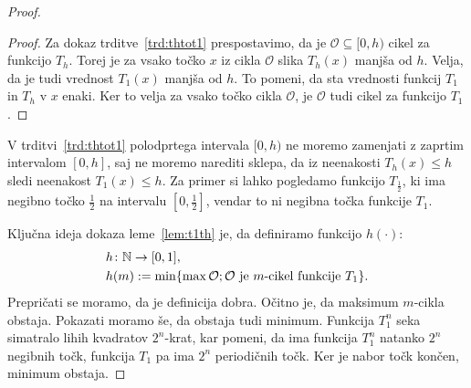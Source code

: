 \documentclass[../TG_magistrsko_delo_sections.tex]{subfiles}
\begin{document}
\begin{proof}
\begin{proof}
Za dokaz trditve~\ref{trd:thtot1} prespostavimo, da je $\mathcal{O} \subseteq [0, h)$ cikel za funkcijo $T_h$. Torej je za vsako točko $x$ iz cikla $\mathcal{O}$ slika $T_h(x)$ manjša od $h$. Velja, da je tudi vrednost $T_1(x)$ manjša od $h$. To pomeni, da sta vrednosti funkcij $T_1$ in $T_h$ v $x$ enaki. Ker to velja za vsako točko cikla $\mathcal{O}$, je $\mathcal{O}$ tudi cikel za funkcijo $T_1$.
\end{proof}
V trditvi~\ref{trd:thtot1} polodprtega intervala $[0, h)$ ne moremo zamenjati z zaprtim intervalom $[0, h]$, saj ne moremo narediti sklepa, da iz neenakosti $T_h(x) \leq h$ sledi neenakost $T_1(x) \leq h$. Za primer si lahko pogledamo funkcijo $T_{\frac{1}{2}}$, ki ima negibno točko $\frac{1}{2}$ na intervalu $[0, \frac{1}{2}]$, vendar to ni negibna točka funkcije $T_1$.

Ključna ideja dokaza leme~\ref{lem:t1th} je, da definiramo funkcijo $h(\cdot)$:
\begin{equation*}
\begin{split}
&h\colon \mathbb N \to [0, 1],\\
&h(m):=  \min\{\max \mathcal{O}; \mathcal{O}\text{ je }m\text{-cikel funkcije }T_1 \}.
\end{split}
\end{equation*}
Prepričati se moramo, da je definicija dobra. Očitno je, da maksimum $m$-cikla obstaja. Pokazati moramo še, da obstaja tudi minimum. Funkcija $T_1^n$ seka simatralo lihih kvadratov $2^n$-krat, kar pomeni, da ima funkcija $T_1^n$ natanko $2^n$ negibnih točk, funkcija $T_1$ pa ima $2^n$ periodičnih točk. Ker je nabor točk končen, minimum obstaja.


\end{proof}
\end{document}
